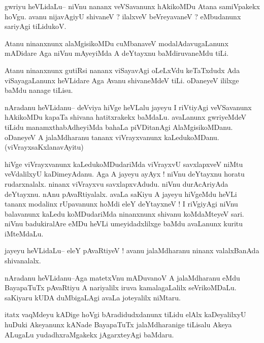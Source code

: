 \documentclass{article}
\begin{document}
\begin{mn}%
gwriyu heVLidaLu-- niVnu nananx veVSavanunx hAkikoMDu Atana samiVpakekx hoVgu. avanu 
nijavAgiyU shivaneV ? ilalxveV beVreyavaneV ? eMbudanunx sariyAgi tiLidukoV.
\end{mn}

\begin{mn}%
Atanu ninanxnunx alaMgisikoMDu cuMbanaveV modalAdavugaLanunx mADidare Aga niVnu mAyeyiMda A 
deYtayxnu  baMdiruvaneMdu tiLi.
\end{mn}

\begin{mn}%
Atanu ninanxnunx gutiRsi nananx viSayavAgi oLeLxVdu keTaTxdudx Ada viSayagaLanunx heVLidare 
Aga Avanu shivaneMdeV tiLi. oDaneyeV ililxge baMdu nanage tiLisu.
\end{mn}

\begin{mn}%
nAradanu heVLidanu-- deVviya hiVge heVLalu jayeyu I riVtiyAgi veVSavanunx hAkikoMDu kapaTa 
shivana hatitxrakekx baMdaLu. avaLanunx gwriyeMdeV tiLidu manamxthabAdheyiMda bahaLa 
piVDitanAgi AlaMgisikoMDanu. oDaneyeV A jalaMdharanu tananx viVrayxvanunx 
kaLedukoMDanu.(viVrayxsaKxlanavAyitu)
\end{mn}

\begin{mn}%
hiVge viVrayxvanunx kaLedukoMDudariMda viVrayxvU savxlapxveV niMtu veVdalilxyU kaDimeyAdanu. 
Aga A jayeyu ayAyx ! niVnu  deYtayxnu horatu rudarxnalalx. ninanx viVrayxvu savxlapxvAdudu. 
niVnu durAcAriyAda deYtayxnu. nAnu pAvaRtiyalalx. avaLa saKiyu A jayeyu hiVgeMdu heVLi 
tananx modalinx rUpavanunx hoMdi eleY deYtayxneV ! I riVgiyAgi niVnu balavanunx kaLedu 
koMDudariMda ninanxnunx shivanu koMdaMteyeV sari. niVnu badukiralAre eMDu heVLi 
umeyidadxlilxge baMdu avaLanunx kuritu iMteMdaLu.
\end{mn}

\begin{mn}%
jayeyu heVLidaLu-- eleY pAvaRtiyeV ! avanu jalaMdharanu ninanx valalxBanAda shivanalalx.
\end{mn}

\begin{mn}%
nAradanu heVLidanu--Aga matetxVnu mADuvanoV A jalaMdharanu eMdu BayapaTuTx pAvaRtiyu A 
nariyalilx iruva kamalagaLalilx seVrikoMDaLu. saKiyaru kUDA duMbigaLAgi avaLa joteyalilx 
niMtaru.
\end{mn}

\begin{mn}%
itatx vaqMdeyu kADige hoVgi bAradidudxdanunx tiLidu elAlx kaDeyalilxyU huDuki Akeyanunx 
kANade BayapaTuTx jalaMdharanige tiLisalu Akeya ALugaLu yudadhxraMgakekx jAgarxteyAgi 
baMdaru.
\end{mn}
\end{document}
